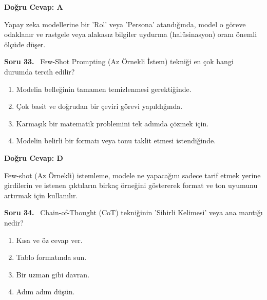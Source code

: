 \documentclass[11pt,a4paper,openany]{book}
\begin{document}
\vspace{4pt}
\begin{tcolorbox}[title=Cevap ve Açıklama, colback=gray!3!white, colframe=primarycolor!90!black, arc=2mm, fonttitle=\bfseries\sffamily, top=6pt, bottom=6pt]
    \textbf{Doğru Cevap: A}

    \vspace{2pt}
    Yapay zeka modellerine bir 'Rol' veya 'Persona' atandığında, model o göreve odaklanır ve rastgele veya alakasız bilgiler uydurma (halüsinasyon) oranı önemli ölçüde düşer.
\end{tcolorbox}
\vspace{10pt}
\needspace{5cm}
\vspace{8pt}
\noindent\textbf{\large\sffamily Soru 33.} \ Few-Shot Prompting (Az Örnekli İstem) tekniği en çok hangi durumda tercih edilir?

\begin{enumerate}[label=\Alph*), leftmargin=25pt, topsep=4pt, itemsep=2pt]
        \item Modelin belleğinin tamamen temizlenmesi gerektiğinde.
        \item Çok basit ve doğrudan bir çeviri görevi yapıldığında.
        \item Karmaşık bir matematik problemini tek adımda çözmek için.
        \item Modelin belirli bir formatı veya tonu taklit etmesi istendiğinde.
\end{enumerate}

\vspace{4pt}
\begin{tcolorbox}[title=Cevap ve Açıklama, colback=gray!3!white, colframe=primarycolor!90!black, arc=2mm, fonttitle=\bfseries\sffamily, top=6pt, bottom=6pt]
    \textbf{Doğru Cevap: D}

    \vspace{2pt}
    Few-shot (Az Örnekli) istemleme, modele ne yapacağını sadece tarif etmek yerine girdilerin ve istenen çıktıların birkaç örneğini göstererek format ve ton uyumunu artırmak için kullanılır.
\end{tcolorbox}
\vspace{10pt}
\needspace{5cm}
\vspace{8pt}
\noindent\textbf{\large\sffamily Soru 34.} \ Chain-of-Thought (CoT) tekniğinin 'Sihirli Kelimesi' veya ana mantığı nedir?

\begin{enumerate}[label=\Alph*), leftmargin=25pt, topsep=4pt, itemsep=2pt]
        \item Kısa ve öz cevap ver.
        \item Tablo formatında sun.
        \item Bir uzman gibi davran.
        \item Adım adım düşün.
\end{enumerate}
\end{document}
